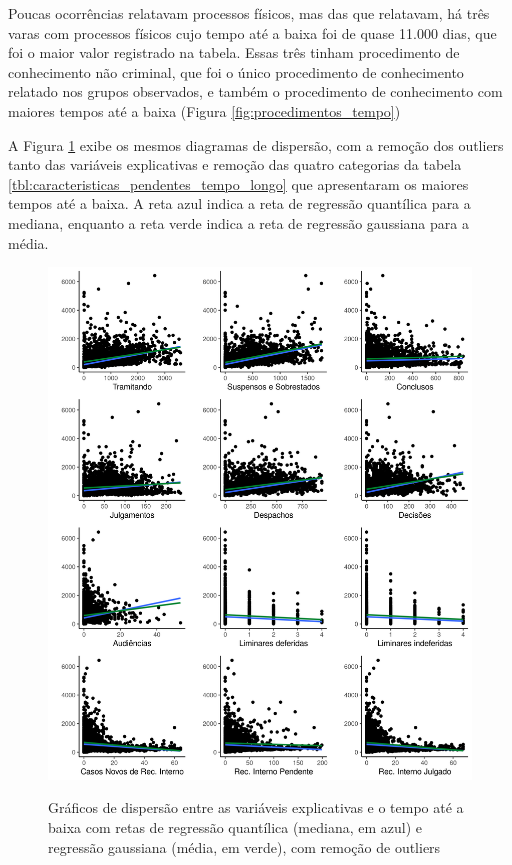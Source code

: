 Poucas ocorrências relatavam processos físicos, mas das que relatavam, há três varas com processos físicos cujo tempo até a baixa foi de quase 11.000 dias, que foi o maior valor registrado na tabela. Essas três tinham procedimento de conhecimento não criminal, que foi o único procedimento de conhecimento relatado nos grupos observados, e também o procedimento de conhecimento com maiores tempos até a baixa (Figura \ref{fig:procedimentos_tempo})

A Figura \ref{fig:cross_charts_without_outliers} exibe os mesmos diagramas de dispersão, com a remoção dos outliers tanto das variáveis explicativas e remoção das quatro categorias da tabela \ref{tbl:caracteristicas_pendentes_tempo_longo} que apresentaram os maiores tempos até a baixa. A reta azul indica a reta de regressão quantílica para a mediana, enquanto a reta verde indica a reta de regressão gaussiana para a média.

\begin{figure}[H]
    \centering
    
    \caption{Gráficos de dispersão entre as variáveis explicativas e o tempo até a baixa com retas de regressão quantílica (mediana, em azul) e regressão gaussiana (média, em verde), com remoção de outliers}
    \includegraphics[scale=.74]{imagens/cross_charts_without_outliers.png}
    \label{fig:cross_charts_without_outliers}
\end{figure}

